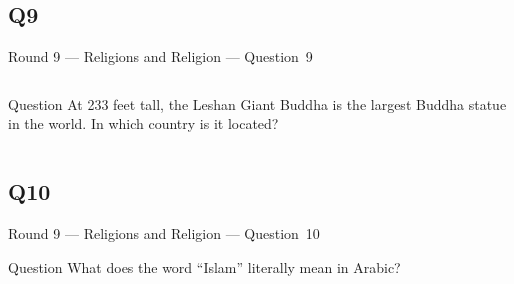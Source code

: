 \documentclass[11pt]{beamer}
\begin{document}
\subsection*{Q9}
\begin{frame}[t]{Round 9 --- Religions and Religion --- \mbox{Question 9}}
\vspace{-0.5em}
\begin{columns}[T,totalwidth=\linewidth]
\begin{column}{0.32\linewidth}
\begin{block}{Question}
At 233 feet tall, the Leshan Giant Buddha is the largest Buddha statue in the world. In which country is it located?
\end{block}
\end{column}
\begin{column}{0.65\linewidth}
\begin{center}
\texttt{[image: \{Images/leshan]}.jpg}
\end{center}
\end{column}
\end{columns}
\end{frame}
\subsection*{Q10}
\begin{frame}[t]{Round 9 --- Religions and Religion --- \mbox{Question 10}}
\vspace{-0.5em}
\begin{block}{Question}
What does the word ``Islam'' literally mean in Arabic?
\end{block}
\end{frame}
\end{document}
